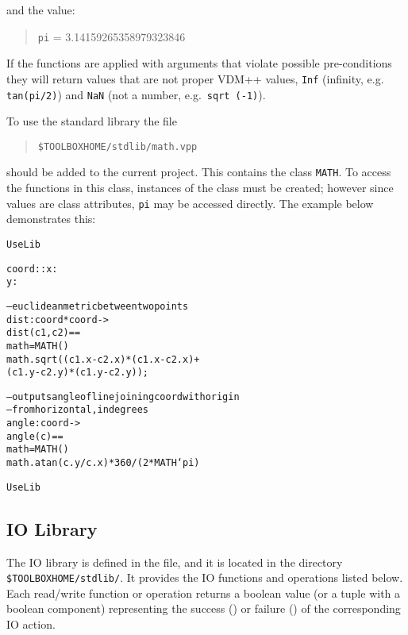 \documentclass[\pformat,12pt]{article}
\newcommand{\vdmslpp}[2]{%
#2
}
\newcommand{\vdmsl}{VDM-SL}
\newcommand{\vdmpp}{VDM++}
\begin{document}
and the value:

\begin{quote}
\texttt{pi} = 3.14159265358979323846
\end{quote}

If the functions are applied with arguments that violate possible
pre-conditions they will return values that are not proper
\vdmslpp{\vdmsl}{\vdmpp} values, {\tt Inf} (infinity, e.g.\ {\tt
  tan(pi/2)}) and {\tt NaN} (not a number, e.g.\ {\tt sqrt (-1)}).


To use the standard library the file 
\begin{quote}
\verb+$TOOLBOXHOME/stdlib/math.vpp+
\end{quote}
should be added to the
current project. This contains the class \texttt{MATH}. To access the
functions in this class, instances of the class must be
created; however since values are class attributes, \texttt{pi} may be
accessed directly. The example below demonstrates this:
\begin{alltt}
 UseLib


  coord :: x : 
           y : 


  -- euclidean metric between two points
  dist : coord * coord -> 
  dist (c1,c2) ==
     math =  MATH()
    math.sqrt((c1.x - c2.x) * (c1.x - c2.x) +
              (c1.y - c2.y) * (c1.y - c2.y));

  -- outputs angle of line joining coord with origin
  -- from horizontal, in degrees
  angle : coord -> 
  angle (c) ==
     math =  MATH()
    math.atan (c.y / c.x) * 360 / ( 2 * MATH`pi)

 UseLib
\end{alltt}

\subsection{IO Library}

The IO library is defined in the 
 file, and it
is located
in the directory \verb+$TOOLBOXHOME/stdlib/+.  
It provides the IO functions and
operations listed below. Each read/write function or operation returns
a boolean 
value (or a tuple with a boolean component) representing the success
() or failure () of the corresponding IO
action. 
\end{document}
